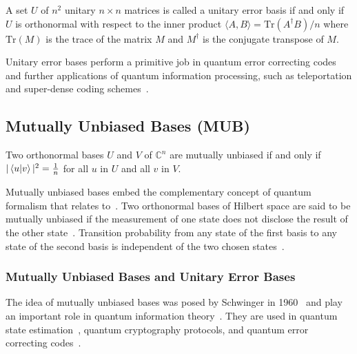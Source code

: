 \begin{definition}
A set $U$ of $n^2$ unitary $n \times n$ matrices is called a unitary error basis if and only if $U$ is orthonormal with respect to the inner product $\langle A, B \rangle = {\textrm{Tr}(A^\dagger B)} / n$ where $\textrm{Tr}(M)$ is the trace of the matrix $M$ and $M^\dagger$ is the conjugate transpose of $M$.
\end{definition}

\noindent Unitary error bases perform a primitive job in quantum error correcting codes and further applications of quantum information processing, such as teleportation and super-dense coding schemes~\cite{klappenecker2003UnitaryErrorBases}.

\subsection{Mutually Unbiased Bases (MUB)}

\begin{definition}
Two orthonormal bases $U$ and $V$ of $\mathbb{C}^n$ are mutually unbiased if and only if $|\braket{u|v}|^2 = \frac{1}{n}$ for all $u$ in $U$ and all $v$ in $V$.
\end{definition}

\noindent Mutually unbiased bases embed the complementary concept of quantum formalism that relates to~\cite{paterek2010ConnectionMutuallyUnbiased}.
Two orthonormal bases of Hilbert space are said to be mutually unbiased if the measurement of one state does not disclose the result of the other state~\cite{song2020ConstructionMutuallyUnbiased}.
Transition probability from any state of the first basis to any state of the second basis is independent of the two chosen states~\cite{song2020ConstructionMutuallyUnbiased}.


\subsubsection*{Mutually Unbiased Bases and Unitary Error Bases}
The idea of mutually unbiased bases was posed by Schwinger in 1960~\cite{schwinger1960UnitaryOperatorBases} and play an important role in quantum information theory~\cite{klappenecker2004ConstructionsMutuallyUnbiased}.
They are used in quantum state estimation~\cite{adamson2008ExperimentalQuantumState, grassl2005TomographyQuantumStates}, quantum cryptography protocols, and quantum error correcting codes~\cite{cerf2002SecurityQuantumKey}.

